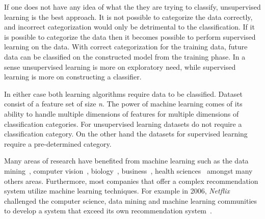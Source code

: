 If one does not have any idea of what the they are trying to classify, unsupervised learning is the best approach. It is not possible to categorize the data correctly, and incorrect categorization would only be detrimental to the classification. If it is possible to categorize the data then it becomes possible to perform supervised learning on the data. With correct categorization for the training data, future data can be classified on the constructed model from the training phase. In a sense unsupervised learning is more on exploratory need, while supervised learning is more on constructing a classifier.

In either case both learning algorithms require data to be classified. Dataset consist of a feature set of size \emph{n}. The power of machine learning comes of its ability to handle multiple dimensions of features for multiple dimensions of classification categories. For unsupervised learning datasets do not require a classification category. On the other hand the datasets for supervised learning require a pre-determined category.

Many areas of research have benefited from machine learning such as the data mining~\cite{WFH11}, computer vision~\cite{Her03}, biology~\cite{OLP08}, business~\cite{Her00}, health sciences~\cite{Kon01} amongst many others areas. Furthermore, most companies that offer a complex recommendation system utilize machine learning techniques. For example in 2006, \emph{Netflix} challenged the computer science, data mining and machine learning communities to develop a system that exceed its own recommendation system~\cite{BL07}.

